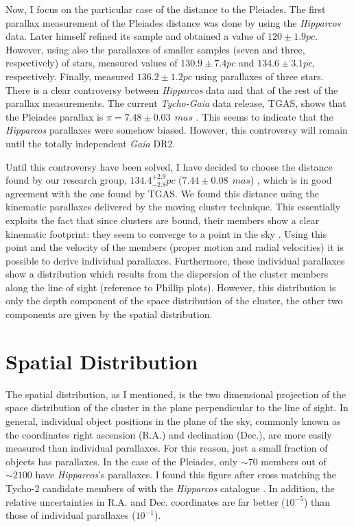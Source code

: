 Now, I focus on the particular case of the distance to the Pleiades. The first parallax measurement of the Pleiades distance was done by \citet{1999A&A...341L..71V} using the \emph{Hipparcos} data. Later himself \citep{2009A&A...497..209V} refined its sample and obtained a value of $120\pm1.9pc$. However, \citet{2000ApJ...533..938G, 2005AJ....129.1616S} using also the parallaxes of smaller samples (seven and three, respectively) of stars, measured values of $130.9\pm7.4pc$ and $134.6\pm3.1pc$, respectively. Finally, \citet{2014Sci...345.1029M} measured $136.2\pm1.2pc$ using parallaxes of three stars. There is a clear controversy between \emph{Hipparcos} data and that of the rest of the parallax measurements. The current \emph{Tycho-Gaia} data release, TGAS, shows that the Pleiades parallax is $\pi = 7.48\pm0.03\ \ mas$ \citep{2017A&A...601A..19G}. This seems to indicate that the \emph{Hipparcos} parallaxes were somehow biased. However, this controversy will remain until the totally independent \emph{Gaia} DR2.

Until this controversy have been solved, I have decided to choose the distance found by our research group, $134.4^{+2.9}_{-2.8}pc$ ($7.44\pm0.08\ \ mas$) \citep{Galli2017}, which is in good agreement with the one found by TGAS. We found this distance using the kinematic parallaxes delivered by the moving cluster technique. This essentially exploits the fact that since clusters are bound, their members show a clear kinematic footprint: they seem to converge to a point in the sky \citep{1964IAUS...20...50B}. Using this point and the velocity of the members (proper motion and radial velocities) it is possible to derive individual parallaxes. Furthermore, these individual parallaxes show a distribution which results from the dispersion of the cluster members along the line of sight (reference to Phillip plots). However, this distribution is only the depth component of the space distribution of the cluster, the other two components are given by the spatial distribution. 

\section{Spatial Distribution}
The spatial distribution, as I mentioned, is the two dimensional projection of the space distribution of the cluster in the plane perpendicular to the line of sight. In general, individual object positions in the plane of the sky, commonly known as the coordinates right ascension (R.A.) and declination (Dec.), are more easily measured than individual parallaxes. For this reason, just a small fraction of objects has parallaxes. In the case of the Pleiades, only $\sim70$ members out of $\sim2100$ have \emph{Hipparcos}'s parallaxes. I found this figure after cross matching the Tycho-2 candidate members of \citet{Bouy2015} with the \emph{Hipparcos} catalogue \citep{1997A&A...323L..49P} . In addition, the relative uncertainties in R.A. and Dec. coordinates are far better ($10^{-5}$) than those of individual parallaxes ($10^{-1}$).

